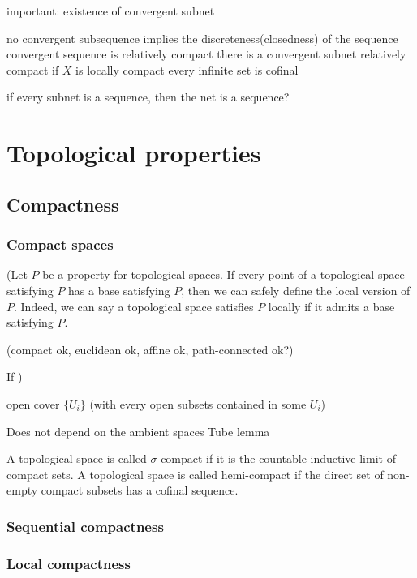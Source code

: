 \documentclass{../../large}
\begin{document}
\begin{prb}
\end{prb}


important: existence of convergent subnet

no convergent subsequence implies the discreteness(closedness) of the sequence
convergent sequence is relatively compact
there is a convergent subnet relatively compact if $X$ is locally compact
every infinite set is cofinal


if every subnet is a sequence, then the net is a sequence?


\part{Topological properties}
\chapter{Compactness}
\section{Compact spaces}



(Let $P$ be a property for topological spaces.
If every point of a topological space satisfying $P$ has a base satisfying $P$, then we can safely define the local version of $P$. Indeed, we can say a topological space satisfies $P$ locally if it admits a base satisfying $P$.

(compact ok, euclidean ok, affine ok, path-connected ok?)

If )

open cover $\{U_i\}$ (with every open subsets contained in some $U_i$)



Does not depend on the ambient spaces
Tube lemma



A topological space is called $\sigma$-compact if it is the countable inductive limit of compact sets.
A topological space is called hemi-compact if the direct set of non-empty compact subsets has a cofinal sequence.

\section{Sequential compactness}
\section{Local compactness}
\end{document}

